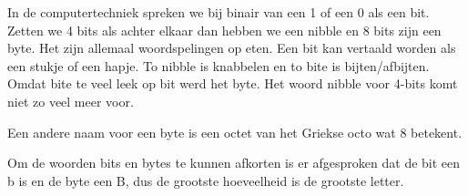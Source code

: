 In de computertechniek spreken we bij binair van een 1 of een 0 als een bit. Zetten we 4 bits als achter elkaar dan hebben we een nibble en 8 bits zijn een byte. Het zijn allemaal woordspelingen op eten. Een bit kan vertaald worden als een stukje of een hapje. To nibble is knabbelen en to bite is bijten/afbijten. Omdat bite te veel leek op bit werd het byte. Het woord nibble voor 4-bits komt niet zo veel meer voor.

Een andere naam voor een byte is een octet van het Griekse octo wat 8 betekent.

Om de woorden bits en bytes te kunnen afkorten is er afgesproken dat de bit een b is en de byte een B, dus de grootste hoeveelheid is de grootste letter.

